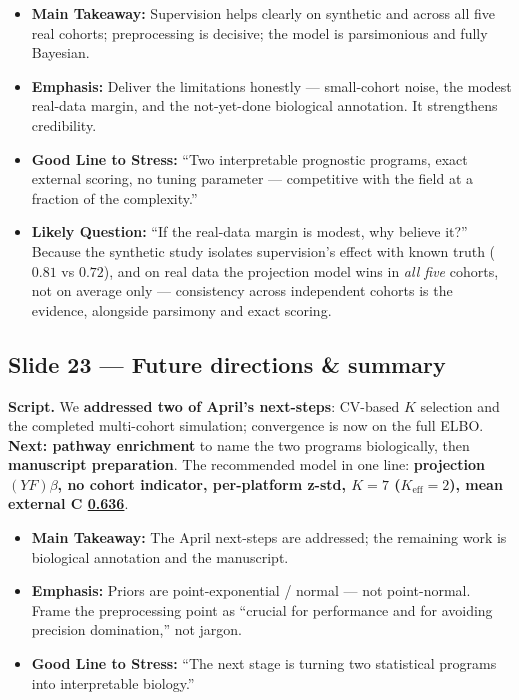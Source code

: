 \documentclass[11pt]{article}
\newcommand{\scriptlabel}{\textbf{Script. }}
\newcommand{\sectionlabel}[1]{\textbf{#1}}
\newcommand{\key}[1]{\textcolor{keyblue}{\textbf{#1}}}        %
\newcommand{\num}[1]{\textcolor{keycar}{\textbf{\uline{#1}}}} %
\begin{document}
\begin{itemize}
\item \sectionlabel{Main Takeaway:} Supervision helps clearly on synthetic and across all five real
cohorts; preprocessing is decisive; the model is parsimonious and fully Bayesian.
\item \sectionlabel{Emphasis:} Deliver the limitations honestly --- small-cohort noise, the modest
real-data margin, and the not-yet-done biological annotation. It strengthens credibility.
\item \sectionlabel{Good Line to Stress:} ``Two interpretable prognostic programs, exact external
scoring, no tuning parameter --- competitive with the field at a fraction of the complexity.''
\item \sectionlabel{Likely Question:} ``If the real-data margin is modest, why believe it?'' Because
the synthetic study isolates supervision's effect with known truth ($0.81$ vs $0.72$), and on real
data the projection model wins in \emph{all five} cohorts, not on average only --- consistency
across independent cohorts is the evidence, alongside parsimony and exact scoring.
\end{itemize}

\subsection*{Slide 23 --- Future directions \& summary}
\scriptlabel We \key{addressed two of April's next-steps}: CV-based $K$ selection and the
completed multi-cohort simulation; convergence is now on the full ELBO. \key{Next: pathway
enrichment} to name the two programs biologically, then \key{manuscript preparation}. The recommended
model in one line: \key{projection $(YF)\beta$, no cohort indicator, per-platform z-std, $K = 7$
($K_{\text{eff}} = 2$), mean external C \num{0.636}}.

\begin{itemize}
\item \sectionlabel{Main Takeaway:} The April next-steps are addressed; the remaining work is
biological annotation and the manuscript.
\item \sectionlabel{Emphasis:} Priors are point-exponential / normal --- not point-normal. Frame the
preprocessing point as ``crucial for performance and for avoiding precision domination,'' not jargon.
\item \sectionlabel{Good Line to Stress:} ``The next stage is turning two statistical programs into
interpretable biology.''
\end{itemize}
\end{document}
